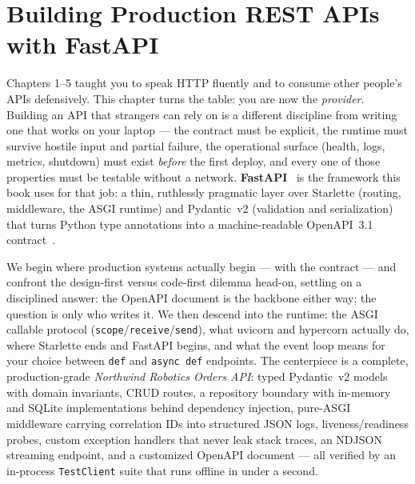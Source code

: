 \chapter{Building Production REST APIs with FastAPI}
\label{ch:fastapi}

Chapters 1--5 taught you to speak HTTP fluently and to consume other people's
APIs defensively. This chapter turns the table: you are now the
\emph{provider}. Building an API that strangers can rely on is a different
discipline from writing one that works on your laptop --- the contract must be
explicit, the runtime must survive hostile input and partial failure, the
operational surface (health, logs, metrics, shutdown) must exist \emph{before}
the first deploy, and every one of those properties must be testable without
a network. \textbf{FastAPI}~\cite{fastapidocs} is the framework this book uses
for that job: a thin, ruthlessly pragmatic layer over Starlette (routing,
middleware, the ASGI runtime) and Pydantic~v2 (validation and serialization)
that turns Python type annotations into a machine-readable OpenAPI~3.1
contract~\cite{openapi31}.

We begin where production systems actually begin --- with the contract --- and
confront the design-first versus code-first dilemma head-on, settling on a
disciplined answer: the OpenAPI document is the backbone either way; the
question is only who writes it. We then descend into the runtime: the ASGI
callable protocol (\texttt{scope}/\texttt{receive}/\texttt{send}), what uvicorn
and hypercorn actually do, where Starlette ends and FastAPI begins, and what
the event loop means for your choice between \texttt{def} and
\texttt{async~def} endpoints. The centerpiece is a complete, production-grade
\emph{Northwind Robotics Orders API}: typed Pydantic~v2 models with domain
invariants, CRUD routes, a repository boundary with in-memory and SQLite
implementations behind dependency injection, pure-ASGI middleware carrying
correlation IDs into structured JSON logs, liveness/readiness probes, custom
exception handlers that never leak stack traces, an NDJSON streaming endpoint,
and a customized OpenAPI document --- all verified by an in-process
\texttt{TestClient} suite that runs offline in under a second.

